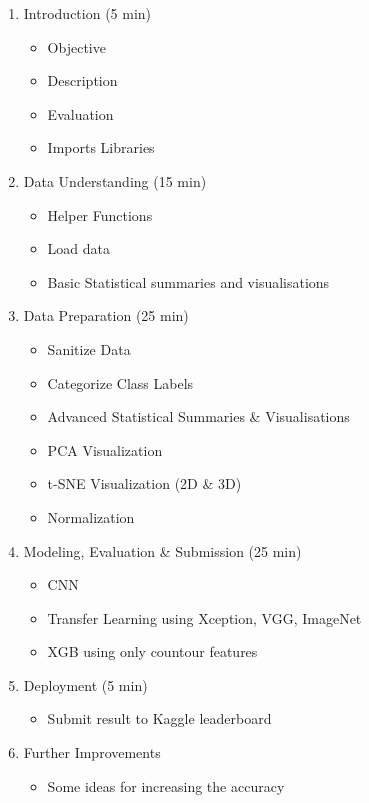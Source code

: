 \documentclass[11pt]{article}
\providecommand{\tightlist}{%
      \setlength{\itemsep}{0pt}\setlength{\parskip}{0pt}}
\begin{document}
\begin{enumerate}
\def\labelenumi{\arabic{enumi}.}
\tightlist
\item
  Introduction (5 min)

  \begin{itemize}
  \tightlist
  \item
    Objective
  \item
    Description
  \item
    Evaluation
  \item
    Imports Libraries
  \end{itemize}
\item
  Data Understanding (15 min)

  \begin{itemize}
  \tightlist
  \item
    Helper Functions
  \item
    Load data
  \item
    Basic Statistical summaries and visualisations
  \end{itemize}
\item
  Data Preparation (25 min)

  \begin{itemize}
  \tightlist
  \item
    Sanitize Data
  \item
    Categorize Class Labels
  \item
    Advanced Statistical Summaries \& Visualisations
  \item
    PCA Visualization
  \item
    t-SNE Visualization (2D \& 3D)
  \item
    Normalization
  \end{itemize}
\item
  Modeling, Evaluation \& Submission (25 min)

  \begin{itemize}
  \tightlist
  \item
    CNN
  \item
    Transfer Learning using Xception, VGG, ImageNet
  \item
    XGB using only countour features
  \end{itemize}
\item
  Deployment (5 min)

  \begin{itemize}
  \tightlist
  \item
    Submit result to Kaggle leaderboard\\
  \end{itemize}
\item
  Further Improvements

  \begin{itemize}
  \tightlist
  \item
    Some ideas for increasing the accuracy
  \end{itemize}
\end{enumerate}
\end{document}
